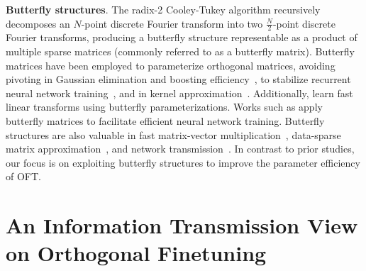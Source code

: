 \textbf{Butterfly structures}. The radix-2 Cooley-Tukey algorithm recursively decomposes an $N$-point discrete Fourier transform into two $\frac{N}{2}$-point discrete Fourier transforms, producing a butterfly structure representable as a product of multiple sparse matrices (commonly referred to as a butterfly matrix). Butterfly matrices have been employed to parameterize orthogonal matrices, avoiding pivoting in Gaussian elimination and boosting efficiency~\cite{parker1995random}, to stabilize recurrent neural network training~\cite{jing2017tunable}, and in kernel approximation~\cite{munkhoeva2018quadrature}. Additionally, \cite{dao2019learning,dao2019kaleidoscope} learn fast linear transforms using butterfly parameterizations. Works such as \cite{chen2022pixelated,dao2022monarch} apply butterfly matrices to facilitate efficient neural network training. Butterfly structures are also valuable in fast matrix-vector multiplication~\cite{michielssen1996multilevel,o2010algorithm}, data-sparse matrix approximation~\cite{li2015butterfly}, and network transmission~\cite{klasing1994broadcasting,li2003linear,rajasingh2016transmission}. In contrast to prior studies, our focus is on exploiting butterfly structures to improve the parameter efficiency of OFT.

\section{An Information Transmission View on Orthogonal Finetuning}

